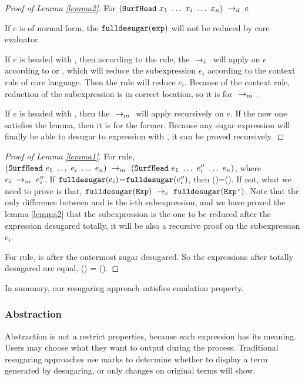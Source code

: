 \begin{proof}[Proof of Lemma \ref{lemma2}]
For $(\mbox{\tt SurfHead}~x_1~\ldots~x_i~\ldots~x_n) ~\rightarrow_d~ e$

If $e$ is of normal form, the $\mbox{\tt fulldesugar}(\mbox{\tt exp})$ will not be reduced by core evaluator.

If $e$ is headed with , then according to the  rule, the $~\rightarrow_e~$ will apply on $e$ according to  or , which will reduce the subexpression $e_i$ according to the context rule of core language. Then the  rule will reduce $e_i$. Because of the context rule, reduction of the subexpression is in correct location, so it is for $~\rightarrow_m~$.

If $e$ is headed with , then the $~\rightarrow_m~$ will apply recursively on $e$. If the new one satisfies the lemma, then it is for the former. Because any sugar expression will finally be able to desugar to expression with , it can be proved recursively.
\end{proof}
\begin{proof}[Proof of Lemma \ref{lemma1}]
\hfill

For  rule, $(\mbox{\tt SurfHead}~e_1~\ldots~e_i~\ldots~e_n) ~\rightarrow_m~(\mbox{\tt SurfHead}~e_1~\ldots~e_i''~\ldots~e_n)$, where $e_i ~\rightarrow_m~e_i''$.
If $\mbox{\tt fulldesugar}(e_i)$=$\mbox{\tt fulldesugar}(e_i'')$, then ()=(). If not,  what we need to prove is that, $\mbox{\tt fulldesugar}(\mbox{\tt Exp}) ~\rightarrow_c~\mbox{\tt fulldesugar}(\mbox{\tt Exp'})$. Note that the only difference between  and  is the i-th subexpression, and we have proved the lemma \ref{lemma2} that the subexpression is the one to be reduced after the expression desugared totally, it will be also a recursive proof on the subexpression $e_i$.

For  rule,  is  after the outermost sugar desugared. So the expressions after totally desugared are equal, () =
().
\end{proof}

In summary, our resugaring approach satisfies emulation property.

\subsubsection{Abstraction}
\label{mark:abs}

Abstraction is not a restrict properties, because each expression has its meaning. Users may choose what they want to output during the process. Traditional resugaring approaches use marks to determine whether to display a term generated by desugaring, or only changes on original terms will show.

